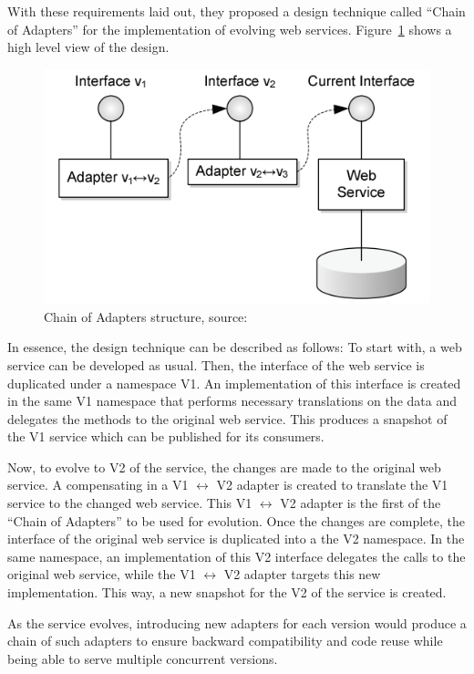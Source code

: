 \documentclass[runningheads,a4paper]{llncs}
\begin{document}
With these requirements laid out, they proposed a design technique called ``Chain of Adapters'' for the implementation of evolving web services. Figure~\ref{fig:chain_of_adapters} shows a high level view of the design.

\begin{figure}[ht]
  \centering
  \includegraphics[scale=0.4]{chain_of_adapters.png}
    \caption{Chain of Adapters structure, source: \cite{kaminski2006design}}
  \label{fig:chain_of_adapters}
\end{figure}

In essence, the design technique can be described as follows: To start with, a web service can be developed as usual. Then, the interface of the web service is duplicated under a namespace V1. An implementation of this interface is created in the same V1 namespace that performs necessary translations on the data and delegates the methods to the original web service. This produces a snapshot of the V1 service which can be published for its consumers.

Now, to evolve to V2 of the service, the changes are made to the original web service. A compensating in a V1 $\leftrightarrow$ V2 adapter is created to translate the V1 service to the changed web service. This V1 $\leftrightarrow$ V2 adapter is the first of the ``Chain of Adapters'' to be used for evolution. Once the changes are complete, the interface of the original web service is duplicated into a the V2 namespace. In the same namespace, an implementation of this V2 interface delegates the calls to the original web service, while the V1 $\leftrightarrow$ V2 adapter targets this new implementation. This way, a new snapshot for the V2 of the service is created.

As the service evolves, introducing new adapters for each version would produce a chain of such adapters to ensure backward compatibility and code reuse while being able to serve multiple concurrent versions.
\end{document}
